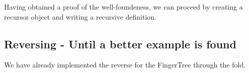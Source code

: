 \documentclass[12pt,twoside,notitlepage]{report}
\begin{document}
Having obtained a proof of the well-foundeness, we can proceed by creating a recursor object and writing a recursive definition.

\subsection{Reversing - Until a better example is found}

We have already implemented the reverse for the FingerTree through the fold. 

\begin{code} 
\\
\>[0]\<[6]%
\>[6] \AgdaSymbol{:}     \<%
\\
\>[0]\<[6]%
\>[6]  \AgdaSymbol{=}   \AgdaSymbol{\_}  \<%
\\
\>[6]\<[8]%
\>[8]  \<%
\\
\>[6]\<[8]%
\>[8] \AgdaSymbol{:}            \AgdaSymbol{)}   \<%
\\
\>[6]\<[8]%
\>[8]   \AgdaInductiveConstructor{,}      \<%
\\
\>[6]\<[8]%
\>[8]   \AgdaSymbol{)} \AgdaInductiveConstructor{,}    \AgdaSymbol{|}  \AgdaSymbol{=}  \<%
\\
\>[6]\<[8]%
\>[8]  \AgdaSymbol{\_} \AgdaInductiveConstructor{,}    \AgdaSymbol{|}    \AgdaSymbol{=}\<%
\\
\>[8]\<[12]%
\>[12] \AgdaSymbol{(} \AgdaSymbol{(}\AgdaSymbol{))} \AgdaSymbol{(} \AgdaSymbol{(} \AgdaSymbol{))}  \<%
\\
\end{code}
\end{document}
